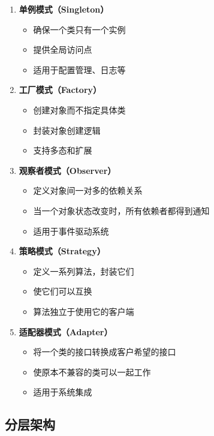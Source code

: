 
\begin{enumerate}
  \item \textbf{单例模式（Singleton）}
    \begin{itemize}
      \item 确保一个类只有一个实例
      \item 提供全局访问点
      \item 适用于配置管理、日志等
    \end{itemize}

  \item \textbf{工厂模式（Factory）}
    \begin{itemize}
      \item 创建对象而不指定具体类
      \item 封装对象创建逻辑
      \item 支持多态和扩展
    \end{itemize}

  \item \textbf{观察者模式（Observer）}
    \begin{itemize}
      \item 定义对象间一对多的依赖关系
      \item 当一个对象状态改变时，所有依赖者都得到通知
      \item 适用于事件驱动系统
    \end{itemize}

  \item \textbf{策略模式（Strategy）}
    \begin{itemize}
      \item 定义一系列算法，封装它们
      \item 使它们可以互换
      \item 算法独立于使用它的客户端
    \end{itemize}

  \item \textbf{适配器模式（Adapter）}
    \begin{itemize}
      \item 将一个类的接口转换成客户希望的接口
      \item 使原本不兼容的类可以一起工作
      \item 适用于系统集成
    \end{itemize}
\end{enumerate}

\subsection{分层架构}


